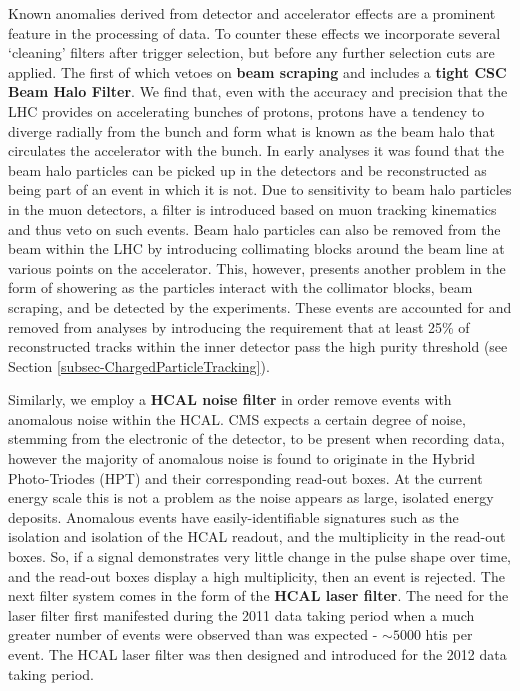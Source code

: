 Known anomalies derived from detector and accelerator effects are a prominent feature in the processing of data. To counter these effects we incorporate several `cleaning' filters after trigger selection, but before any further selection cuts are applied. The first of which vetoes on \textbf{beam scraping} and includes a \textbf{tight CSC Beam Halo Filter}. We find that, even with the accuracy and precision that the LHC provides on accelerating bunches of protons, protons have a tendency to diverge radially from the bunch and form what is known as the beam halo that circulates the accelerator with the bunch. In early analyses it was found that the beam halo particles can be picked up in the detectors and be reconstructed as being part of an event in which it is not. Due to sensitivity to beam halo particles in the muon detectors, a filter is introduced based on muon tracking kinematics and thus veto on such events. Beam halo particles can also be removed from the beam within the LHC by introducing collimating blocks around the beam line at various points on the accelerator. This, however, presents another problem in the form of showering as the particles interact with the collimator blocks, beam scraping, and be detected by the experiments. These events are accounted for and removed from analyses by introducing the requirement that at least 25\% of reconstructed tracks within the inner detector pass the high purity threshold (see Section \ref{subsec-ChargedParticleTracking}). 

Similarly, we employ a \textbf{HCAL noise filter} in order remove events with anomalous noise within the HCAL. CMS expects a certain degree of noise, stemming from the electronic of the detector, to be present when recording data, however the majority of anomalous noise is found to originate in the Hybrid Photo-Triodes (HPT) and their corresponding read-out boxes. At the current energy scale this is not a problem as the noise appears as large, isolated energy deposits. Anomalous events have easily-identifiable signatures such as the isolation and isolation of the HCAL readout, and the multiplicity in the read-out boxes. So, if a signal demonstrates very little change in the pulse shape over time, and the read-out boxes display a high multiplicity, then an event is rejected. The next filter system comes in the form of the \textbf{HCAL laser filter}. The need for the laser filter first manifested during the 2011 data taking period when a much greater number of events were observed than was expected - $\sim5000$ htis per event. The HCAL laser filter was then designed and introduced for the 2012 data taking period.  

